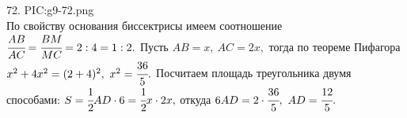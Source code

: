 72. {{PIC:g9-72.png}}\\
По свойству основания биссектрисы имеем соотношение $\cfrac{AB}{AC}=\cfrac{BM}{MC}=2:4=1:2.$ Пусть $AB=x,\ AC=2x,$ тогда по теореме Пифагора $x^2+4x^2=(2+4)^2,\ x^2=\cfrac{36}{5}.$ Посчитаем площадь треугольника двумя способами: $S=\cfrac{1}{2}AD\cdot6=\cfrac{1}{2}x\cdot2x,$ откуда $6AD=2\cdot\cfrac{36}{5},\ AD=\cfrac{12}{5}.$\\
